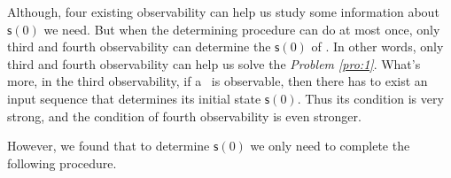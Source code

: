 Although, four existing observability can help us study some information about $\mathsf{s}(0)$ we need. But when the determining procedure can do at most once, only third and fourth observability  can  determine the $\mathsf{s}(0)$ of \BCNs. %
In other words, only third and fourth observability can help us solve the {\em Problem \ref{pro:1}}. What's more, in the third observability, if a \BCN\ is observable, then there has to exist an input sequence that determines its initial state $\mathsf{s}(0)$. Thus its condition is very strong, and the condition of fourth observability is even stronger. 


However, we found that to determine $\mathsf{s}(0)$ we only need to complete the following procedure.


